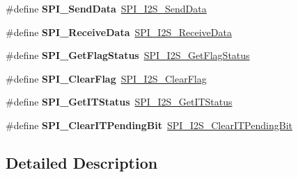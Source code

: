 \begin{DoxyCompactItemize}
\item 
\hypertarget{group___s_p_i___i2_s___legacy_gad0647692e317283bc4c8ead37558b198}{\#define {\bfseries S\-P\-I\-\_\-\-Send\-Data}~\hyperlink{group___s_p_i___group2_gad5af40bebe8dbe3fa8bd476489d7e3da}{S\-P\-I\-\_\-\-I2\-S\-\_\-\-Send\-Data}}\label{group___s_p_i___i2_s___legacy_gad0647692e317283bc4c8ead37558b198}

\item 
\hypertarget{group___s_p_i___i2_s___legacy_ga62c3f7d78506b029ebb1845342e5bc05}{\#define {\bfseries S\-P\-I\-\_\-\-Receive\-Data}~\hyperlink{group___s_p_i___group2_gab77de76547f3bff403236b263b070a30}{S\-P\-I\-\_\-\-I2\-S\-\_\-\-Receive\-Data}}\label{group___s_p_i___i2_s___legacy_ga62c3f7d78506b029ebb1845342e5bc05}

\item 
\hypertarget{group___s_p_i___i2_s___legacy_ga188075bf183b67201651e20b227fe7a7}{\#define {\bfseries S\-P\-I\-\_\-\-Get\-Flag\-Status}~\hyperlink{group___s_p_i___group5_ga1bd785d129e09c5734a876c8f2767204}{S\-P\-I\-\_\-\-I2\-S\-\_\-\-Get\-Flag\-Status}}\label{group___s_p_i___i2_s___legacy_ga188075bf183b67201651e20b227fe7a7}

\item 
\hypertarget{group___s_p_i___i2_s___legacy_ga9fde1f0c2f8d9f5690fe3d058d16ed5c}{\#define {\bfseries S\-P\-I\-\_\-\-Clear\-Flag}~\hyperlink{group___s_p_i___group5_ga3aabd9e2437e213056c0ed9bdfa1a724}{S\-P\-I\-\_\-\-I2\-S\-\_\-\-Clear\-Flag}}\label{group___s_p_i___i2_s___legacy_ga9fde1f0c2f8d9f5690fe3d058d16ed5c}

\item 
\hypertarget{group___s_p_i___i2_s___legacy_ga4ebfa18a880b0eec4142e74cad021dd9}{\#define {\bfseries S\-P\-I\-\_\-\-Get\-I\-T\-Status}~\hyperlink{group___s_p_i___group5_ga72decbc1cd79f8fad92a2204beca6bc5}{S\-P\-I\-\_\-\-I2\-S\-\_\-\-Get\-I\-T\-Status}}\label{group___s_p_i___i2_s___legacy_ga4ebfa18a880b0eec4142e74cad021dd9}

\item 
\hypertarget{group___s_p_i___i2_s___legacy_gab5f0a306ab6c4dc0775314f367fe935e}{\#define {\bfseries S\-P\-I\-\_\-\-Clear\-I\-T\-Pending\-Bit}~\hyperlink{group___s_p_i___group5_ga35a524a49ff3d058137060f751e8749f}{S\-P\-I\-\_\-\-I2\-S\-\_\-\-Clear\-I\-T\-Pending\-Bit}}\label{group___s_p_i___i2_s___legacy_gab5f0a306ab6c4dc0775314f367fe935e}

\end{DoxyCompactItemize}


\subsection{Detailed Description}
